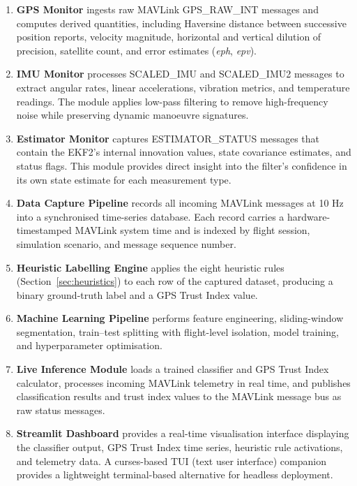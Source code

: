 \documentclass[electronics,article,accept,moreauthors]{Definitions/mdpi}
\begin{document}
\begin{enumerate}
\item \textbf{GPS Monitor} ingests raw MAVLink GPS\_RAW\_INT messages and computes derived quantities, including Haversine distance between successive position reports, velocity magnitude, horizontal and vertical dilution of precision, satellite count, and error estimates ({\it eph}, {\it epv}).
\item \textbf{IMU Monitor} processes SCALED\_IMU and SCALED\_IMU2 messages to extract angular rates, linear accelerations, vibration metrics, and temperature readings. The module applies low-pass filtering to remove high-frequency noise while preserving dynamic manoeuvre signatures.
\item \textbf{Estimator Monitor} captures ESTIMATOR\_STATUS messages that contain the EKF2's internal innovation values, state covariance estimates, and status flags. This module provides direct insight into the filter's confidence in its own state estimate for each measurement type.
\item \textbf{Data Capture Pipeline} records all incoming MAVLink messages at 10 Hz into a synchronised time-series database. Each record carries a hardware-timestamped MAVLink system time and is indexed by flight session, simulation scenario, and message sequence number.
\item \textbf{Heuristic Labelling Engine} applies the eight heuristic rules (Section~\ref{sec:heuristics}) to each row of the captured dataset, producing a binary ground-truth label and a GPS Trust Index value.
\item \textbf{Machine Learning Pipeline} performs feature engineering, sliding-window segmentation, train--test splitting with flight-level isolation, model training, and hyperparameter optimisation.
\item \textbf{Live Inference Module} loads a trained classifier and GPS Trust Index calculator, processes incoming MAVLink telemetry in real time, and publishes classification results and trust index values to the MAVLink message bus as raw status messages.
\item \textbf{Streamlit Dashboard} provides a real-time visualisation interface displaying the classifier output, GPS Trust Index time series, heuristic rule activations, and telemetry data. A curses-based TUI (text user interface) companion provides a lightweight terminal-based alternative for headless deployment.
\end{enumerate}
\end{document}
